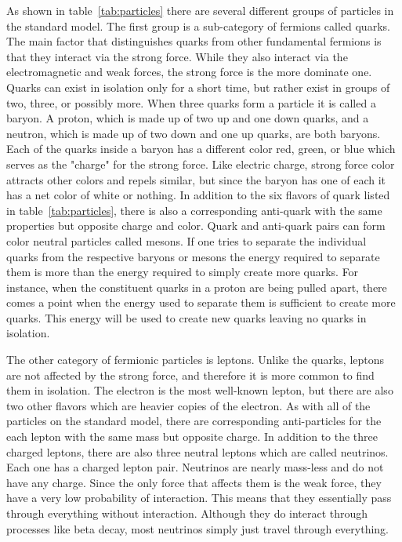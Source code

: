 As shown in table~\ref{tab:particles} there are several different groups of particles in the standard model. The first group is a sub-category of fermions called quarks. The main factor that distinguishes quarks from other fundamental fermions is that they interact via the strong force. While they also interact via the electromagnetic and weak forces, the strong force is the more dominate one. Quarks can exist in isolation only for a short time, but rather exist in groups of two, three, or possibly more. When three quarks form a particle it is called a baryon. A proton, which is made up of two up and one down quarks, and a neutron, which is made up of two down and one up quarks, are both baryons. Each of the quarks inside a baryon has a different color red, green, or blue which serves as the "charge" for the strong force. Like electric charge, strong force color attracts other colors and repels similar, but since the baryon has one of each it has a net color of white or nothing. In addition to the six flavors of quark listed in table~\ref{tab:particles}, there is also a corresponding anti-quark with the same properties but opposite charge and color. Quark and anti-quark pairs can form color neutral particles called mesons. If one tries to separate the individual quarks from the respective baryons or mesons the energy required to separate them is more than the energy required to simply create more quarks. For instance, when the constituent quarks in a proton are being pulled apart, there comes a point when the energy used to separate them is sufficient to create more quarks. This energy will be used to create new quarks leaving no quarks in isolation.

The other category of fermionic particles is leptons. Unlike the quarks, leptons are not affected by the strong force, and therefore it is more common to find them in isolation. The electron is the most well-known lepton, but there are also two other flavors which are heavier copies of the electron. As with all of the particles on the standard model, there are corresponding anti-particles for the each lepton with the same mass but opposite charge. In addition to the three charged leptons, there are also three neutral leptons which are called neutrinos. Each one has a charged lepton pair. Neutrinos are nearly mass-less and do not have any charge. Since the only force that affects them is the weak force, they have a very low probability of interaction. This means that they essentially pass through everything without interaction. Although they do interact through processes like beta decay, most neutrinos simply just travel through everything. 


